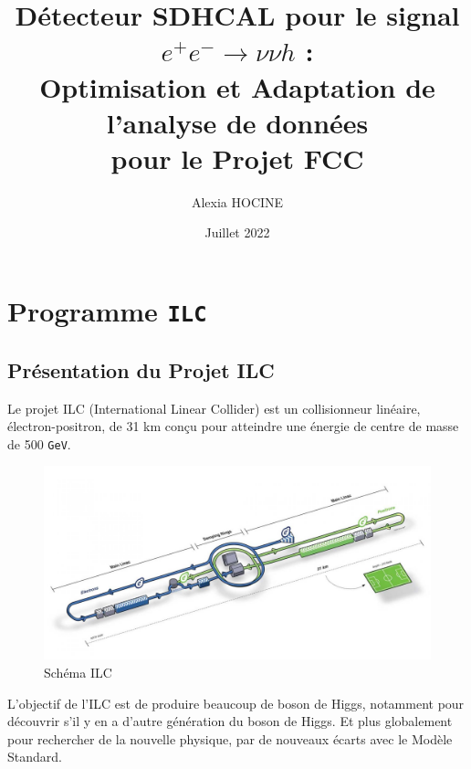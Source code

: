 \documentclass[10pt,a4paper]{report}
\author{Alexia \textsc{HOCINE}}
\title{Détecteur SDHCAL pour le signal  $ e^{+} e^{-} \longrightarrow \nu \nu h $ :\\Optimisation et Adaptation de l'analyse de données\\pour le Projet FCC 
}
\date{Juillet 2022}
\newcommand{\MS}{Modèle Standard\xspace}
\newcommand{\GeV}{\texttt{GeV}}
\begin{document}






\tableofcontents







\chapter{Programme \texttt{ILC}}

\section{Présentation du Projet ILC}

Le projet ILC (International Linear Collider) est un collisionneur linéaire, électron-positron, de 31 km conçu pour atteindre une énergie de centre de masse de 500 \GeV \cite{cern:ilc}. \\

\begin{figure}[h!]
	\center
	\includegraphics[width=\textwidth]{../img/ilc.jpg} 
	\caption{Schéma ILC\cite{cern:ilc}}
	\label{ilc:schema}
\end{figure}

L'objectif de l'ILC est de produire beaucoup de boson de Higgs, notamment pour découvrir s'il y en a d'autre génération du boson de Higgs. Et plus globalement pour rechercher de la nouvelle physique, par de nouveaux écarts avec le \MS.\\
\end{document}
